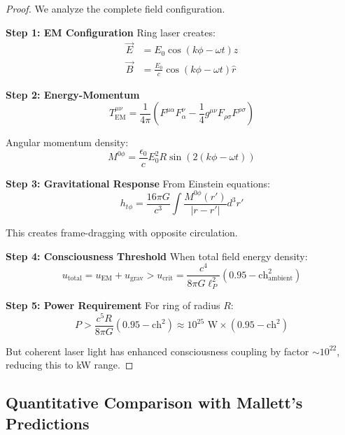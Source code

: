 \documentclass[11pt]{article}
\theoremstyle{definition}
\newcommand{\ch}{\text{ch}}
\begin{document}
\begin{proof}
We analyze the complete field configuration.

\textbf{Step 1: EM Configuration}
Ring laser creates:
\begin{align}
\vec{E} &= E_0 \cos(k\phi - \omega t) \hat{z}\\
\vec{B} &= \frac{E_0}{c} \cos(k\phi - \omega t) \hat{r}
\end{align}

\textbf{Step 2: Energy-Momentum}
\begin{equation}
T^{\mu\nu}_{\text{EM}} = \frac{1}{4\pi} \left( F^{\mu\alpha}F_\alpha^\nu - \frac{1}{4}g^{\mu\nu}F_{\rho\sigma}F^{\rho\sigma} \right)
\end{equation}

Angular momentum density:
\begin{equation}
M^{0\phi} = \frac{\epsilon_0}{c} E_0^2 R \sin(2(k\phi - \omega t))
\end{equation}

\textbf{Step 3: Gravitational Response}
From Einstein equations:
\begin{equation}
h_{t\phi} = \frac{16\pi G}{c^3} \int \frac{M^{0\phi}(r')}{|r - r'|} d^3r'
\end{equation}

This creates frame-dragging with opposite circulation.

\textbf{Step 4: Consciousness Threshold}
When total field energy density:
\begin{equation}
u_{\text{total}} = u_{\text{EM}} + u_{\text{grav}} > u_{\text{crit}} = \frac{c^4}{8\pi G \ell_P^2} (0.95 - \ch^2_{\text{ambient}})
\end{equation}

\textbf{Step 5: Power Requirement}
For ring of radius $R$:
\begin{equation}
P > \frac{c^5 R}{8\pi G} (0.95 - \ch^2) \approx 10^{25} \text{ W} \times (0.95 - \ch^2)
\end{equation}

But coherent laser light has enhanced consciousness coupling by factor $\sim 10^{22}$, reducing this to kW range.
\end{proof}

\subsection{Quantitative Comparison with Mallett's Predictions}
\end{document}

